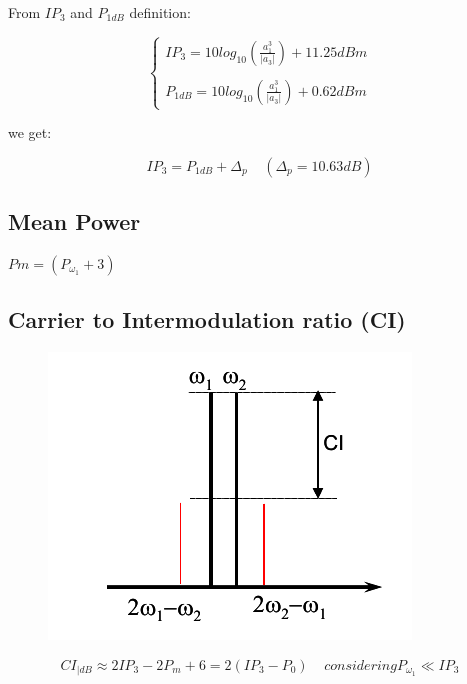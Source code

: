 From $IP_3$ and $P_{1dB}$ definition:

\[
\begin{cases}
	IP_3 = 10log_{10}\left(\frac{a_1^3}{|a_3|}\right) + 11.25dBm\\
	\\
	P_{1dB}= 10log_{10}\left(\frac{a_1^3}{|a_3|}\right) +0.62dBm
\end{cases}
\]

we get:

\begin{equation}
	IP_3= P_{1dB} + \Delta_p \ \ \ \ \ (\Delta_p = 10.63dB)
\end{equation}

\subsection{Mean Power} %
\label{sub:mean_power}

$Pm =(P_{\omega_1}+3)$



\subsection{Carrier to Intermodulation ratio (CI)} %
\label{sub:ci_carrier_to_intermodulation_ratio}




\begin{figure}[ht]
	\centering
	\includegraphics[scale=0.4]{Immagini/ci}
	\label{fig:ci}
\end{figure}
\begin{equation}
	CI_{|dB} \approx 2IP_3 - 2P_m +6= 2(IP_3-P_0) \ \ \ \ \ considering P_{\omega_1} \ll IP_3
\end{equation}

